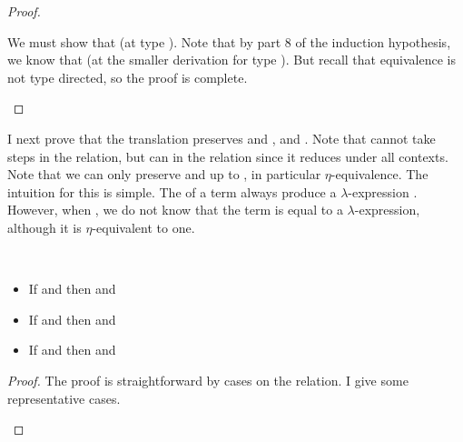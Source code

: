 {\begin{proof}
\begin{proofcases}
    We must show that \im{(\subst{\se}{\sepr}{\sx})^\div \equiv
      \subst{\se^\div}{\se^{\sprime\div}}{\cpsx}} (at type \im{\sA}).
    Note that by part 8 of the induction hypothesis, we know that
    \im{(\subst{\se}{\sepr}{\sx})^\div \equiv
      \subst{\se^\div}{\se^{\sprime\div}}{\cpsx}} (at the smaller derivation for type \im{\sB}).
    But recall that equivalence is not type directed, so the proof is complete. \qedhere
    \end{proofcases}
\end{proof}

I next prove that the translation preserves  and
,  and
.
Note that  cannot take steps in the  relation, but
can in the  relation since it reduces under all contexts.
Note that we can only preserve  and  up to
, in particular \(\eta\)-equivalence.
The intuition for this is simple.
The  of a term \im{\se^{\sprime\div}} always
produce a \(\lambda\)-expression
\im{\cpsnfune{\cpsalpha}{\cpsnfune{\cpsk}{\cpsepr[2]}}}.
However, when \im{\se^\div \stepstar \cpsepr}, we do not know that the term
\im{\cpsepr} is equal to a \(\lambda\)-expression, although it is
\(\eta\)-equivalent to one.
\begin{lemma}
  \label{lem:cps:cbn:pres-red}
  ~
  \begin{itemize}
    \item If \im{\styjudg{\slenv}{\se}{\sA}} and \im{\se \step \sepr} then
      \im{\se^{\div} \stepstar \cpsepr} and \im{\cpsepr \equiv \se^{\sprime\div}}
    \item If \im{\styjudg{\slenv}{\sA}{\sK}} and \im{\sA \step \sApr} then
      \im{\sA^{+} \stepstar \cpsApr} and \im{\cpsApr \equiv \sA^{\sprime+}}
    \item If \im{\styjudg{\slenv}{\sA}{\sstarty}} and \im{\sA \step \sApr} then
      \im{\sA^{\div} \stepstar \cpsApr} and \im{\cpsApr \equiv \sA^{\sprime\div}}
  \end{itemize}
\end{lemma}
\begin{proof}
  The proof is straightforward by cases on the  relation.
  I give some representative cases.
  \begin{proofcases}
    \item \im{\sx \step_{\delta} \sepr~\where{\sx = \sepr : \sApr \in \slenv}}


\end{proofcases}
\end{proof}}
